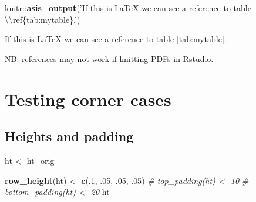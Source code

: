 \documentclass[]{article}
\newenvironment{Shaded}{\begin{snugshade}}{\end{snugshade}}
\newcommand{\KeywordTok}[1]{\textcolor[rgb]{0.13,0.29,0.53}{\textbf{{#1}}}}
\newcommand{\DecValTok}[1]{\textcolor[rgb]{0.00,0.00,0.81}{{#1}}}
\newcommand{\CharTok}[1]{\textcolor[rgb]{0.31,0.60,0.02}{{#1}}}
\newcommand{\StringTok}[1]{\textcolor[rgb]{0.31,0.60,0.02}{{#1}}}
\newcommand{\CommentTok}[1]{\textcolor[rgb]{0.56,0.35,0.01}{\textit{{#1}}}}
\newcommand{\NormalTok}[1]{{#1}}
\begin{document}
\begin{Shaded}
\begin{Highlighting}[]
\NormalTok{knitr::}\KeywordTok{asis_output}\NormalTok{(}\StringTok{'If this is LaTeX we can see a reference to table }\CharTok{\textbackslash{}\textbackslash{}}\StringTok{ref\{tab:mytable\}.'}\NormalTok{)}
\end{Highlighting}
\end{Shaded}

If this is LaTeX we can see a reference to table
\ref{tab:mytable}.\FloatBarrier

NB: references may not work if knitting PDFs in Rstudio.

\section{Testing corner cases}\label{testing-corner-cases}

\subsection{Heights and padding}\label{heights-and-padding}

\begin{Shaded}
\begin{Highlighting}[]
\NormalTok{ht <-}\StringTok{ }\NormalTok{ht_orig}

\KeywordTok{row_height}\NormalTok{(ht) <-}\StringTok{ }\KeywordTok{c}\NormalTok{(.}\DecValTok{1}\NormalTok{, .}\DecValTok{05}\NormalTok{, .}\DecValTok{05}\NormalTok{, .}\DecValTok{05}\NormalTok{)}
\CommentTok{# top_padding(ht) <- 10}
\CommentTok{# bottom_padding(ht) <- 20}
\NormalTok{ht}
\end{Highlighting}
\end{Shaded}
\end{document}
